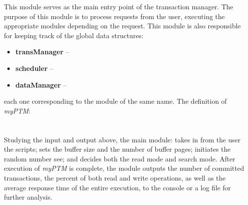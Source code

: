 This module serves as the main entry point of the transaction manager. The purpose of this module is to process requests from the user, executing the appropriate modules depending on the request. This module is also responsible for keeping track of the global data structures:

\begin{itemize}
 \item \textbf{transManager} --
 \item \textbf{scheduler} -- 
 \item  \textbf{dataManager} --
 \end{itemize}

each one corresponding to the module of the same name. The definition of \textit{myPTM}:\\

\noindent{}  \\ \\


Studying the input and output above, the main module: takes in from the user the scripts; sets the buffer size and the number of buffer pages; initiates the random number see; and decides both the read mode and search mode. After execution of \textit{myPTM} is complete, the module outputs the number of committed transactions, the percent of both read and write operations, as well as the average response time of the entire execution, to the console or a log file for further analysis.